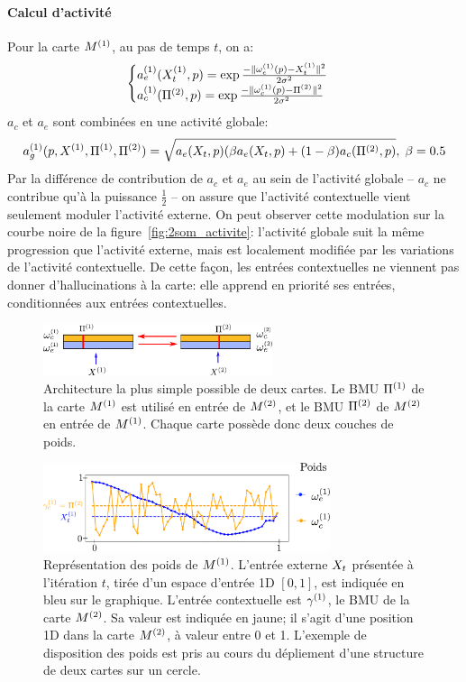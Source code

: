 \paragraph{Calcul d'activité}
Pour la carte $M^{({1})}$, au pas de temps $t$, on a:
\begin{equation}
\label{eq:activite}
\begin{cases}
a_e^{({1})}(X_t^{({1})},p) = \exp\frac{-\lVert \omega_e^{({1})}(p)-X^{({1})}_t \rVert^2}{2\sigma^2} \\
a_c^{({1})}(\Pi^{({2})},p) = \exp\frac{-\lVert \omega_c^{({1})}(p)-\Pi^{({2})} \rVert ^2}{2\sigma^2}\\
\end{cases}
\end{equation}
$a_c$ et $a_e$ sont combinées en une activité globale:
\begin{equation}
a_g^{({1})}(p,X^{({1})},\Pi^{({1})},\Pi^{({2})}) = \sqrt{a_e(X_t,p)(\beta a_e(X_t,p) + (1-\beta) a_c(\Pi^{({2})},p)}, \; \beta=0.5
\end{equation}
Par la différence de contribution de $a_c$ et $a_e$ au sein de l'activité globale -- $a_c$ ne contribue qu'à la puissance $\frac{1}{2}$ -- on assure que l'activité contextuelle vient seulement moduler l'activité externe. On peut observer cette modulation sur la courbe noire de la figure~\ref{fig:2som_activite}: l'activité globale suit la même progression que l'activité externe, mais est localement modifiée par les variations de l'activité contextuelle. De cette façon, les entrées contextuelles ne viennent pas donner d'hallucinations à la carte: elle apprend en priorité ses entrées, conditionnées aux entrées contextuelles.
\begin{figure}
\centering
\includegraphics[width=0.6\textwidth]{archi_2som}
\caption{Architecture la plus simple possible de deux cartes. Le BMU $\Pi^{({1})}$ de la carte $M^{({1})}$ est utilisé en entrée de $M^{({2})}$, et le BMU $\Pi^{({2})}$ de $M^{({2})}$ en entrée de $M^{({1})}$. Chaque carte possède donc deux couches de poids. \label{fig:2som_archi}}
\end{figure}
\begin{figure}
\centering
\includegraphics[width=0.75\textwidth]{weights_2som.pdf}
\caption{Représentation des poids de $M^{({1})}$. L'entrée externe $X_t$ présentée à l'itération $t$, tirée d'un espace d'entrée 1D $[0,1]$, est indiquée en bleu sur le graphique. L'entrée contextuelle  est $\gamma^{({1})}$, le BMU de la carte $M^{({2})}$. Sa valeur est indiquée en jaune; il s'agit d'une position 1D dans la carte $M^{({2})}$, à valeur entre 0 et 1. L'exemple de disposition des poids est pris au cours du dépliement d'une structure de deux cartes sur un cercle. \label{fig:2som_weights}}
\end{figure}
